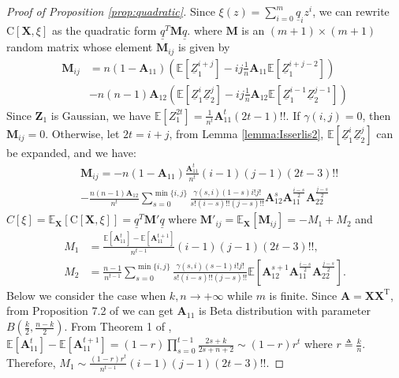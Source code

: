 \documentclass[conference]{IEEEtran}
\def\E{\mathbb{E}}
\def\T{\mathrm{T}}
\newcommand{\ide}[2]{ \gamma(#1,#2) }
\begin{document}
\begin{proof}[Proof of Proposition \ref{prop:quadratic}]
Since 
$\xi(z) = \sum_{i=0}^m \underline{q}_i z^i $, we can rewrite $\mathrm{C}[\bm{X}, \xi]$
as the quadratic form $ \underline{q}^T \bm{M} \underline{q} $.
where $\bm{M}$ is an $(m+1) \times (m+1) $ random matrix 
whose element $\bm{M}_{ij}$ is given by
\begin{align*}
    \bm{M}_{ij} &= n(1-\bm{A}_{11}) (\E[\underline{Z}_1^{i+j}] -
    ij \frac{1}{n}\bm{A}_{11} \E[\underline{Z}_1^{i+j-2}])  \\
    &-n(n-1)\bm{A}_{12}(\E[\underline{Z}_1^i \underline{Z}_2^j] - ij \frac{1}{n}\bm{A}_{12}\E[\underline{Z}_1^{i-1}\underline{Z}_2^{j-1}])
\end{align*}
Since $\bm{Z}_1$ is Gaussian, we have $\E[Z_1^{2t}] = \frac{1}{n^t}\bm{A}_{11}^t (2t-1)!!$. If $\ide{i}{j} = 0$, then $\bm{M}_{ij}=0$. Otherwise,
let $ 2t = i + j $, from Lemma \ref{lemma:Isserlis2}, $\E[\underline{Z}_1^i \underline{Z}_2^j]$ can be expanded, and we have:
\begin{align*}
    &\bm{M}_{ij} = -n(1-\bm{A}_{11}) \frac{\bm{A}_{11}^t}{n^t}(i-1)(j-1)(2t-3)!! \\
    &-\frac{n(n-1)\bm{A}_{12}}{n^t}\sum_{s=0}^{\min\{i,j\}}
    \frac{\ide{s}{i}(1-s)i!j!}{s!(i-s)!!(j-s)!!}
    \bm{A}_{12}^s \bm{A}_{11}^{\frac{i - s}{2}}\bm{A}_{22}^{\frac{j - s}{2}}
\end{align*}
$C[\xi] = \E_{\bm{X}}[\mathrm{C}[\bm{X}, \xi]] =  \underline{q}^T \mathbf{M}' \underline{q}$
where $\mathbf{M}'_{ij} = \E_{\bm{X}} [\bm{M}_{ij}] = -M_1 + M_2$
and 
\begin{align*}
    M_1 & =   \frac{\E[\bm{A}_{11}^t]-\E[\bm{A}_{11}^{t+1}]}{n^{t-1}}(i-1)(j-1)(2t-3)!!, \\
    M_2 & = \frac{n-1}{n^{t-1}}\sum_{s=0}^{\min\{i,j\}}
    \frac{\ide{s}{i}(s-1)i!j!}{s!(i-s)!!(j-s)!!}
    \E[\bm{A}_{12}^{s+1} \bm{A}_{11}^{\frac{i - s}{2}}\bm{A}_{22}^{\frac{j - s}{2}}].
\end{align*}
Below we consider the case when $k, n \to +\infty$ while $m$ is finite. Since $\bm{A}=\bm{X}\bm{X}^\T$, from Proposition 7.2 of \cite{eaton1989group} we can get $\bm{A}_{11}$ is Beta distribution with parameter $B(\frac{k}{2}, \frac{n-k}{2})$.
From Theorem 1 of \cite{multivariateBeta},
$\E[\bm{A}_{11}^t]-\E[\bm{A}_{11}^{t+1}] = (1-r)\prod_{s=0}^{t-1} \frac{2s+k}{2s+n+2} \sim (1-r)r^t$ where
$ r \triangleq \frac{k}{n}$. Therefore, $M_1 \sim \frac{(1-r)r^t}{n^{t-1}}(i-1)(j-1)(2t-3)!!$.

\end{proof}
\end{document}
